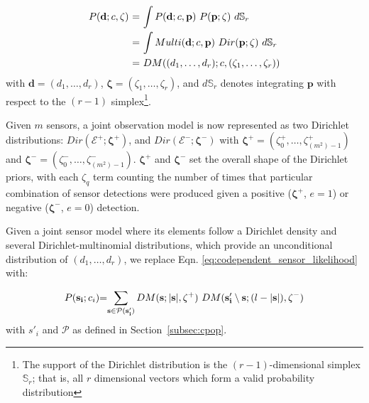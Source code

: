 \begin{equation}
	\label{eq:beta_binomial_revisit}
	\begin{tabular}{r@{ = }l}
        $P(\mathbf{d} ; c, \mathbf{\zeta})$ & $\displaystyle\int P(\mathbf{d} ; c, \mathbf{p}) ~ P(\mathbf{p} ; \mathbf{\zeta}) ~d\mathbb S_r$ \\ [2ex]
        & $\displaystyle\int Multi(\mathbf{d} ; c, \mathbf{p}) ~ Dir(\mathbf{p} ; \mathbf{\zeta}) ~d\mathbb S_r$ \\ [2ex]
        & $DM((d_1, \ldots, d_r) ; c, (\zeta_1, \ldots, \zeta_r))$
	\end{tabular}
\end{equation}
\noindent with $\mathbf{d} = (d_1, \ldots, d_r)$, $\mathbf{\zeta} = (\zeta_1, \ldots, \zeta_r)$, and $d\mathbb S_r$ denotes integrating $\mathbf{p}$ with respect to the $(r - 1)$ simplex\footnote{The support of the Dirichlet distribution is the $(r - 1)$-dimensional simplex $\mathbb S_r$; that is, all $r$ dimensional vectors which form a valid probability distribution}.

Given $m$ sensors, a joint observation model is now represented as two Dirichlet distributions: $Dir(\mathcal{E^+} ; \mathbf{\zeta^+})$, and $Dir(\mathcal{E^-} ; \mathbf{\zeta^-})$ with $\mathbf{\zeta^+} = (\zeta^+_0, \ldots, \zeta^+_{(m^2)-1})$ and $\mathbf{\zeta^-} = (\zeta^-_0, \ldots, \zeta^-_{(m^2)-1})$. $\mathbf{\zeta^+}$ and $\mathbf{\zeta^-}$ set the overall shape of the Dirichlet priors, with each $\zeta_q$ term counting the number of times that particular combination of sensor detections were produced given a positive ($\mathbf{\zeta^+}$, $e=1$) or negative ($\mathbf{\zeta^-}$, $e=0$) detection.


Given a joint sensor model where its elements follow a Dirichlet density and several Dirichlet-multinomial distributions, which provide an unconditional distribution of $(d_1, \ldots, d_r)$, we replace Eqn. \ref{eq:codependent_sensor_likelihood} with:  

\begin{equation}
	\label{eq:joint_dirichlet_multinomial_distribution}
    \begin{tabular}{r@{=}l}
		$P(\mathbf{s_i} ; c_i)$ & $\displaystyle\sum_{\mathbf{s} \in \mathcal{P}(\mathbf{s'_i})} DM(\mathbf{s} ; |\mathbf{s}|, \mathbf{\zeta^+}) ~ DM(\mathbf{s'_i}\setminus\mathbf{s} ; (l - |\mathbf{s}|), \mathbf{\zeta^-})$
	\end{tabular}
\end{equation}
\noindent with $s'_i$ and $\mathcal{P}$ as defined in Section~\ref{subsec:cpop}.

